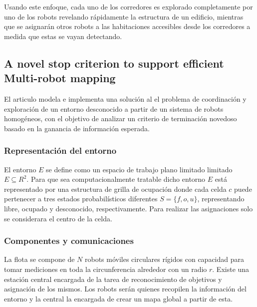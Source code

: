 Usando este enfoque, cada uno de los corredores es explorado completamente por uno de los robots revelando rápidamente la estructura de un edificio, mientras que se asignarán otros robots a las habitaciones accesibles desde los corredores a medida que estas se vayan detectando.



\subsection{A novel stop criterion to support efficient Multi-robot mapping}\cite{amorin2019novel}
El articulo modela e implementa una solución al el problema de coordinación y exploración de un entorno desconocido a partir de un sistema de robots homogéneos, con el objetivo de analizar un criterio de terminación novedoso basado en la ganancia de información esperada.


\subsubsection{Representación del entorno}
El entorno $E$ se define como un espacio de trabajo plano limitado limitado $E\subseteq R^2$. Para que sea computacionalmente tratable dicho entorno $E$ está representado por una estructura de grilla de ocupación donde cada celda $c$ puede pertenecer a tres estados probabilísticos diferentes $S = \{f, o, u\}$, representando libre, ocupado y desconocido, respectivamente. Para realizar las asignaciones solo se considerara el centro de la celda.

\subsubsection{Componentes y comunicaciones}
La flota se compone de $N$ robots móviles circulares rígidos con capacidad para tomar mediciones en toda la circunferencia alrededor con un radio $r$. Existe una estación central encargada de la tarea de reconocimiento de objetivos y asignación de los mismos. Los robots serán quienes recopilen la información del entorno y la central la encargada de crear un mapa global a partir de esta. 

